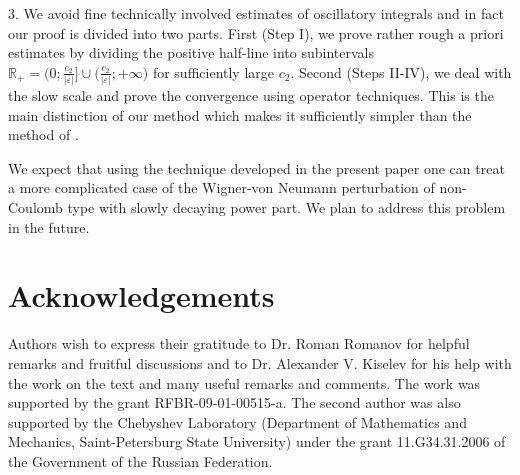 \documentclass[a4paper,oneside,12pt]{amsart}
\begin{document}
3. We avoid fine technically involved estimates of   oscillatory
integrals and in fact our proof is divided into two parts. First
(Step I), we prove rather rough a priori estimates by dividing the
positive half-line into subintervals $\mathbb
R_+=\bigl(0;\frac{c_2}{|\varepsilon|}\bigr]\cup\bigl(\frac{c_2}{|\varepsilon|};+\infty\bigr)$
for  sufficiently large $c_2$. Second (Steps II-IV), we deal with
the slow scale and prove the convergence using operator
techniques. This is the main distinction of our method which makes
it sufficiently simpler than the method of
\cite{Hinton-Klaus-Shaw-1991}.

We expect  that using the technique developed in the present paper
one can treat a more complicated case of the Wigner-von Neumann
perturbation of non-Coulomb type with slowly decaying power part.
We plan to address this problem in the future.

\section*{Acknowledgements}
Authors wish to express their gratitude to Dr. Roman Romanov for
helpful remarks and fruitful discussions and to Dr. Alexander V.
Kiselev for his help with the work on the text and many useful
remarks and comments. The work was supported by the grant
RFBR-09-01-00515-a. The second author was also supported by the Chebyshev Laboratory
(Department of Mathematics and Mechanics, Saint-Petersburg State
University) under the grant 11.G34.31.2006 of the Government of the
Russian Federation. 
\end{document}
